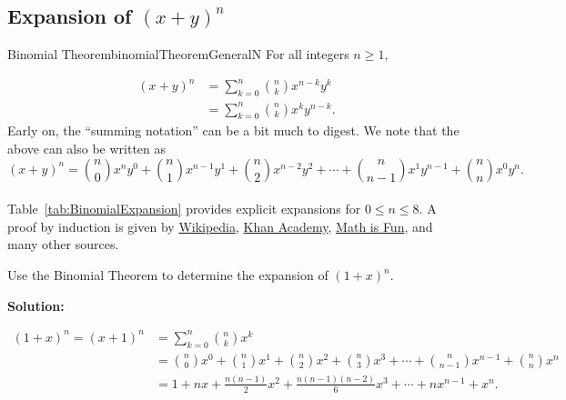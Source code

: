 \subsection{Expansion of \texorpdfstring{$(x + y)^n$}{(x + y)n}}

\begin{thmColor}{Binomial Theorem}{binomialTheoremGeneralN} 
For all integers $n\ge 1$,

\begin{equation}
\begin{aligned}
    (x+y)^{n}&=\sum _{k=0}^{n}\binom{n}{k}x^{n-k}y^{k} \\
    &=\sum _{k=0}^{n}\binom{n}{k}x^{k}y^{n-k}.
\end{aligned}
\end{equation}
Early on, the ``summing notation'' can be a bit much to digest. We note that the above can also be written as
 $$ (x+y)^{n}=\binom{n}{0}x^{n}y^{0}+\binom{n}{1}x^{n-1}y^{1}+\binom{n}{2}x^{n-2}y^{2}+\cdots +\binom{n}{n-1}x^{1}y^{n-1}+\binom{n}{n}x^{0}y^{n}.$$\\

 Table~\ref{tab:BinomialExpansion} provides explicit expansions for $0 \le n \le 8$. A proof by induction is given by \href{https://en.wikipedia.org/wiki/Binomial_theorem#:~:text=the%20binomial%20theorem.-,Inductive%20proof,-%5Bedit%5D}{Wikipedia}, \href{https://www.khanacademy.org/math/in-in-grade-11-ncert/x79978c5cf3a8f108:binomial-theorem/x79978c5cf3a8f108:intro-to-the-binomial-theorem/v/binomial-theorem}{Khan Academy}, \href{https://www.mathsisfun.com/algebra/binomial-theorem.html}{Math is Fun}, and many other sources.
    
\end{thmColor}

\bigskip

\begin{example}
\label{ex:BinomialFor1PlusX}
 Use the Binomial Theorem to determine the expansion of $(1 + x)^n$.
    
\end{example}

\textbf{Solution:} 

\begin{align*}
(1+x)^{n} = (x+1)^n &= \sum_{k=0}^{n}\binom{n}{k}x^{k} \\
&= \binom{n}{0}x^{0} + \binom{n}{1}x^{1} + \binom{n}{2}x^{2} + \binom{n}{3}x^{3} +\cdots + \binom{n}{n-1}x^{n-1} + \binom{n}{n}x^{n} \\
&= 1 + nx + \frac {n(n-1)}{2}x^{2} + \frac {n(n-1)(n-2)}{6}x^{3} + \cdots + nx^{n-1} + x^{n}.
\end{align*}
\Qed



